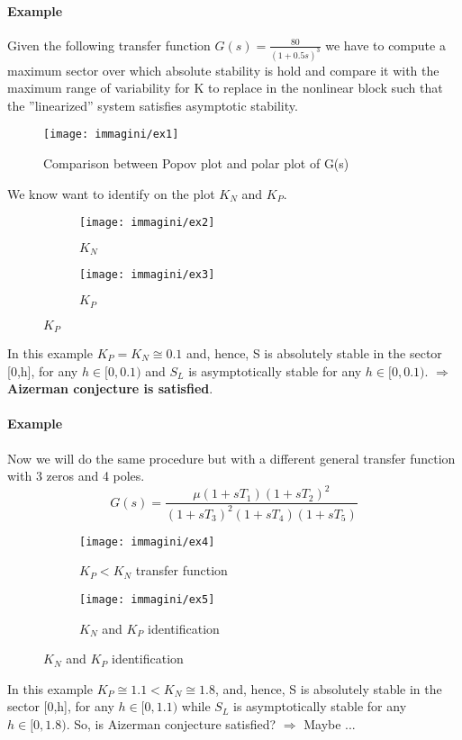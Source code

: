 \paragraph{Example}	Given the following transfer function \textbf{$G(s)=\frac{80}{(1+0.5s)^3}$} we have to compute a maximum sector over which absolute stability is hold and compare it with the maximum range of variability for K to replace in the nonlinear block such that the ''linearized'' system satisfies asymptotic stability.
\begin{figure}[H]
	\centering
	\texttt{[image: immagini/ex1]}
	\caption{Comparison between Popov plot and polar plot of G(s)}
	\label{fig:ex5}
\end{figure}
We know want to identify on the plot $K_N$ and $K_P$.
\begin{figure}[H]
	\centering
	\begin{subfigure}[b]{0.3\textwidth}
		\centering
		\texttt{[image: immagini/ex2]}
		\caption{$K_N$}
		\label{fig:kn}
	\end{subfigure}
	\hfill
	\begin{subfigure}[b]{0.3\textwidth}
		\centering
		\texttt{[image: immagini/ex3]}
		\caption{$K_P$}
		\label{fig:kp}
	\end{subfigure}
	\hfill
	\label{fig:esempio1}
\end{figure}
In this example $K_P=K_N\cong 0.1$ and, hence, S is absolutely stable in the sector [0,h], for any $h \in [0,0.1)$ and $S_L$ is asymptotically stable for any $h \in [0,0.1)$. $\Longrightarrow$ \textbf{Aizerman conjecture is satisfied}.

\paragraph{Example} Now we will do the same procedure but with a different general transfer function with 3 zeros and 4 poles.\[G(s)=\frac{\mu(1+sT_1)(1+sT_2)^2}{(1+sT_3)^2(1+sT_4)(1+sT_5)}\]
\begin{figure}[H]
	\centering
	\begin{subfigure}[b]{0.3\textwidth}
		\centering
		\texttt{[image: immagini/ex4]}
		\caption{$K_P<K_N$ transfer function}
		\label{fig:plopov}
	\end{subfigure}
	\hfill
	\begin{subfigure}[b]{0.3\textwidth}
		\centering
		\texttt{[image: immagini/ex5]}
		\caption{$K_N$ and $K_P$ identification}
		\label{fig:kp&kn}
	\end{subfigure}
	\hfill
	\label{fig:esempio2}
\end{figure}
In this example $K_P\cong1.1<K_N\cong1.8$, and, hence, S is absolutely stable in the sector [0,h], for any $h\in[ 0,1.1)$ while $S_L$ is asymptotically stable for any $h\in[0,1.8)$. So, is Aizerman conjecture satisfied? $\Rightarrow$ Maybe ...
